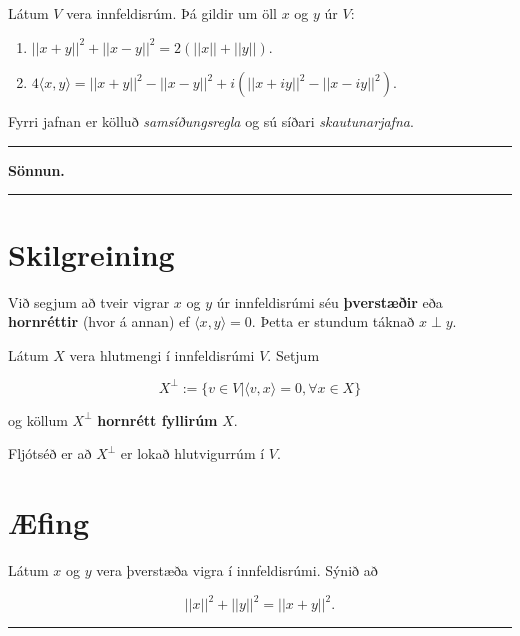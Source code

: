 \documentclass[]{book}
\providecommand{\tightlist}{%
  \setlength{\itemsep}{0pt}\setlength{\parskip}{0pt}}
\begin{document}
Látum \(V\) vera innfeldisrúm. Þá gildir um öll \(x\) og \(y\) úr \(V\):

\begin{enumerate}
\def\labelenumi{\arabic{enumi}.}
\tightlist
\item
  \(||x + y||^2 + ||x - y||^2 = 2(||x|| + ||y||)\).
\item
  \(4\langle x,y\rangle = ||x+y||^2 - ||x-y||^2 + i(||x+iy||^2 - ||x-iy||^2)\).
\end{enumerate}

Fyrri jafnan er kölluð \emph{samsíðungsregla} og sú síðari \emph{skautunarjafna}.

\begin{center}\rule{0.5\linewidth}{\linethickness}\end{center}

\textbf{Sönnun.}

\begin{center}\rule{0.5\linewidth}{\linethickness}\end{center}

\hypertarget{skilgreining-25}{%
\section*{Skilgreining}\label{skilgreining-25}}

Við segjum að tveir vigrar \(x\) og \(y\) úr innfeldisrúmi séu \textbf{þverstæðir} eða \textbf{hornréttir} (hvor á annan) ef \(\langle x,y\rangle = 0\). Þetta er stundum táknað \(x\perp y\).

Látum \(X\) vera hlutmengi í innfeldisrúmi \(V\). Setjum

\[
X^\perp := \{v\in V|\langle v,x\rangle = 0, \forall x\in X\}
\]

og köllum \(X^\perp\) \textbf{hornrétt fyllirúm} \(X\).

Fljótséð er að \(X^\perp\) er lokað hlutvigurrúm í \(V\).

\hypertarget{fing-4}{%
\section*{Æfing}\label{fing-4}}

Látum \(x\) og \(y\) vera þverstæða vigra í innfeldisrúmi. Sýnið að

\[
||x||^2 + ||y||^2 = ||x + y||^2.
\]

\begin{center}\rule{0.5\linewidth}{\linethickness}\end{center}
\end{document}

